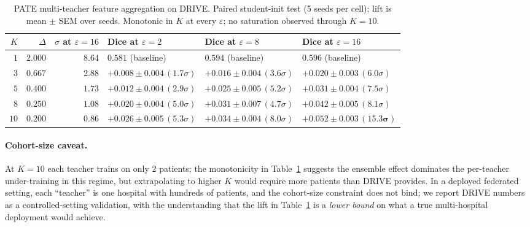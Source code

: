 \begin{table}[t]
\centering
\small
\caption{PATE multi-teacher feature aggregation on DRIVE. Paired
student-init test (5 seeds per cell); lift is mean $\pm$ SEM over
seeds. Monotonic in $K$ at every $\varepsilon$; no saturation observed
through $K\!=\!10$.}
\label{tab:pate-ksweep}
\begin{tabular}{r r r l l l}
\toprule
$K$ & $\Delta$ & $\sigma$ at $\varepsilon\!=\!16$
                                  & Dice at $\varepsilon\!=\!2$
                                                       & Dice at $\varepsilon\!=\!8$
                                                                              & Dice at $\varepsilon\!=\!16$ \\
\midrule
$1$  & $2.000$ & $8.64$  & $0.581$ (baseline)         & $0.594$ (baseline)            & $0.596$ (baseline) \\
$3$  & $0.667$ & $2.88$  & $+0.008\pm 0.004\,(1.7\sigma)$ & $+0.016\pm 0.004\,(3.6\sigma)$ & $+0.020\pm 0.003\,(6.0\sigma)$ \\
$5$  & $0.400$ & $1.73$  & $+0.012\pm 0.004\,(2.9\sigma)$ & $+0.025\pm 0.005\,(5.2\sigma)$ & $+0.031\pm 0.004\,(7.5\sigma)$ \\
$8$  & $0.250$ & $1.08$  & $+0.020\pm 0.004\,(5.0\sigma)$ & $+0.031\pm 0.007\,(4.7\sigma)$ & $+0.042\pm 0.005\,(8.1\sigma)$ \\
$10$ & $0.200$ & $0.86$  & $+0.026\pm 0.005\,(5.3\sigma)$ & $+0.034\pm 0.004\,(8.0\sigma)$ & $\mathbf{+0.052\pm 0.003\,(15.3\sigma)}$ \\
\bottomrule
\end{tabular}
\end{table}

\paragraph{Cohort-size caveat.}
At $K\!=\!10$ each teacher trains on only $2$ patients; the
monotonicity in Table~\ref{tab:pate-ksweep} suggests the ensemble
effect dominates the per-teacher under-training in this regime, but
extrapolating to higher $K$ would require more patients than DRIVE
provides. In a deployed federated setting, each ``teacher'' is one
hospital with hundreds of patients, and the cohort-size constraint
does not bind; we report DRIVE numbers as a controlled-setting
validation, with the understanding that the lift in
Table~\ref{tab:pate-ksweep} is a \emph{lower bound} on what a true
multi-hospital deployment would achieve.

